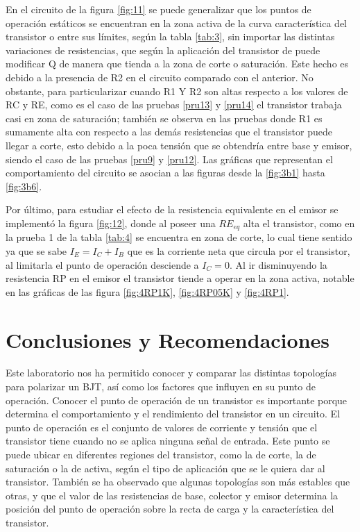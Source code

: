 \documentclass[10pt, a4paper]{article}
\begin{document}
    En el circuito de la figura \ref{fig:11} se puede generalizar que los puntos de operación estáticos se encuentran en la zona activa de la curva característica del transistor o entre sus límites, según la tabla \ref{tab:3}, sin importar las distintas variaciones de resistencias, que según la aplicación del transistor de puede modificar Q de manera que tienda a la zona de corte o saturación. Este hecho es debido a la presencia de R2 en el circuito comparado con el anterior. No obstante, para particularizar cuando R1 Y R2 son altas respecto a los valores de RC y RE, como es el caso de las pruebas \ref{pru13} y \ref{pru14} el transistor trabaja casi en zona de saturación; también se observa en las pruebas donde R1 es sumamente alta con respecto a las demás resistencias que el transistor puede llegar a corte, esto debido a la poca tensión que se obtendría entre base y emisor, siendo el caso de las pruebas \ref{pru9} y \ref{pru12}. Las gráficas que representan el comportamiento del circuito se asocian a las figuras desde la \ref{fig:3b1} hasta \ref{fig:3b6}.

    Por último, para estudiar el efecto de la resistencia equivalente en el emisor se implementó la figura \ref{fig:12}, donde al poseer una $RE_{eq}$ alta el transistor, como en la prueba 1 de la tabla \ref{tab:4} se encuentra en zona de corte, lo cual tiene sentido ya que se sabe $I_E = I_C + I_B$ que es la corriente neta que circula por el transistor, al limitarla el punto de operación desciende a $I_C = 0$. Al ir disminuyendo la resistencia RP en el emisor el transistor tiende a operar en la zona activa, notable en las gráficas de las figura \ref{fig:4RP1K}, \ref{fig:4RP05K} y \ref{fig:4RP1}.

    \newpage

    \section{Conclusiones y Recomendaciones}

    Este laboratorio nos ha permitido conocer y comparar las distintas topologías para polarizar un BJT, así como los factores que influyen en su punto de operación. Conocer el punto de operación de un transistor es importante porque determina el comportamiento y el rendimiento del transistor en un circuito. El punto de operación es el conjunto de valores de corriente y tensión que el transistor tiene cuando no se aplica ninguna señal de entrada. Este punto se puede ubicar en diferentes regiones del transistor, como la de corte, la de saturación o la de activa, según el tipo de aplicación que se le quiera dar al transistor. También se ha observado que algunas topologías son más estables que otras, y que el valor de las resistencias de base, colector y emisor determina la posición del punto de operación sobre la recta de carga y la característica del transistor.
    
\end{document}
